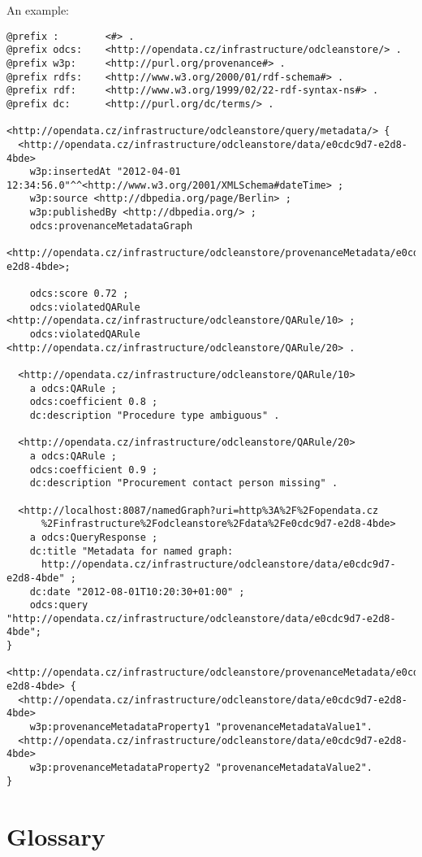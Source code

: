 \pagebreak

An example:

\begin{lstlisting}[caption={Example of query response in TriG}]
@prefix :        <#> .
@prefix odcs:    <http://opendata.cz/infrastructure/odcleanstore/> .
@prefix w3p:     <http://purl.org/provenance#> .
@prefix rdfs:    <http://www.w3.org/2000/01/rdf-schema#> .
@prefix rdf:     <http://www.w3.org/1999/02/22-rdf-syntax-ns#> .
@prefix dc:      <http://purl.org/dc/terms/> .

<http://opendata.cz/infrastructure/odcleanstore/query/metadata/> {
  <http://opendata.cz/infrastructure/odcleanstore/data/e0cdc9d7-e2d8-4bde>
    w3p:insertedAt "2012-04-01 12:34:56.0"^^<http://www.w3.org/2001/XMLSchema#dateTime> ;
    w3p:source <http://dbpedia.org/page/Berlin> ;
    w3p:publishedBy <http://dbpedia.org/> ;
    odcs:provenanceMetadataGraph
      <http://opendata.cz/infrastructure/odcleanstore/provenanceMetadata/e0cdc9d7-e2d8-4bde>;
        
    odcs:score 0.72 ;
    odcs:violatedQARule <http://opendata.cz/infrastructure/odcleanstore/QARule/10> ;
    odcs:violatedQARule <http://opendata.cz/infrastructure/odcleanstore/QARule/20> .  

  <http://opendata.cz/infrastructure/odcleanstore/QARule/10>
    a odcs:QARule ;
    odcs:coefficient 0.8 ;
    dc:description "Procedure type ambiguous" .
        
  <http://opendata.cz/infrastructure/odcleanstore/QARule/20>
    a odcs:QARule ;
    odcs:coefficient 0.9 ;
    dc:description "Procurement contact person missing" .
        
  <http://localhost:8087/namedGraph?uri=http%3A%2F%2Fopendata.cz
      %2Finfrastructure%2Fodcleanstore%2Fdata%2Fe0cdc9d7-e2d8-4bde>
    a odcs:QueryResponse ;
    dc:title "Metadata for named graph:
      http://opendata.cz/infrastructure/odcleanstore/data/e0cdc9d7-e2d8-4bde" ;
    dc:date "2012-08-01T10:20:30+01:00" ;
    odcs:query "http://opendata.cz/infrastructure/odcleanstore/data/e0cdc9d7-e2d8-4bde";
}
    
<http://opendata.cz/infrastructure/odcleanstore/provenanceMetadata/e0cdc9d7-e2d8-4bde> {
  <http://opendata.cz/infrastructure/odcleanstore/data/e0cdc9d7-e2d8-4bde>
    w3p:provenanceMetadataProperty1 "provenanceMetadataValue1".
  <http://opendata.cz/infrastructure/odcleanstore/data/e0cdc9d7-e2d8-4bde>
    w3p:provenanceMetadataProperty2 "provenanceMetadataValue2".
}
\end{lstlisting}





\appendix

\chapter{Glossary}


